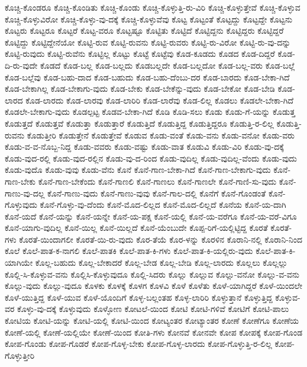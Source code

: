 {ಕೊಚ್ಚಿ-ಕೊಂಡರೂ
ಕೊಚ್ಚಿ-ಕೊಂಡಿತು
ಕೊಚ್ಚಿ-ಕೊಂಡು
ಕೊಚ್ಚಿ-ಕೊಳ್ಳುತ್ತಿ-ರು-ವಿರಿ
ಕೊಚ್ಚಿ-ಕೊಳ್ಳುತ್ತೇವೆ
ಕೊಚ್ಚಿ-ಕೊಳ್ಳುವ
ಕೊಚ್ಚಿ-ಕೊಳ್ಳುವಿರೋ
ಕೊಚ್ಚಿ-ಕೊಳ್ಳು-ವು-ದಕ್ಕೆ
ಕೊಚ್ಚಿ-ಕೊಳ್ಳುವೆವು
ಕೊಟ್ಟ
ಕೊಟ್ಟಂತೆ
ಕೊಟ್ಟದ್ದು
ಕೊಟ್ಟದ್ದೇ
ಕೊಟ್ಟನು
ಕೊಟ್ಟರು
ಕೊಟ್ಟರೂ
ಕೊಟ್ಟರೆ
ಕೊಟ್ಟ-ವರೂ
ಕೊಟ್ಟಷ್ಟೂ
ಕೊಟ್ಟಿತು
ಕೊಟ್ಟಿದೆ
ಕೊಟ್ಟಿದ್ದನು
ಕೊಟ್ಟಿದ್ದರು
ಕೊಟ್ಟಿದ್ದರೆ
ಕೊಟ್ಟಿದ್ದು
ಕೊಟ್ಟಿದ್ದೇನೆಯೋ
ಕೊಟ್ಟಿ-ರುವ
ಕೊಟ್ಟಿ-ರುವನು
ಕೊಟ್ಟಿ-ರುವರು
ಕೊಟ್ಟಿ-ರು-ವಿರೋ
ಕೊಟ್ಟಿ-ರು-ವು-ದನ್ನು
ಕೊಟ್ಟಿ-ರುವುದು
ಕೊಟ್ಟಿ-ರುವೆನು
ಕೊಟ್ಟಿಲ್ಲ
ಕೊಟ್ಟು
ಕೊಟ್ಟೆ
ಕೊಟ್ಟೆವು
ಕೊಡ-ಕೂಡದು
ಕೊಡದ
ಕೊಡ-ದಿದ್ದರೆ
ಕೊಡ-ದಿ-ರು-ವುದೇ
ಕೊಡದೆ
ಕೊಡ-ಬಲ್ಲ
ಕೊಡ-ಬಲ್ಲದು
ಕೊಡಬಲ್ಲದೇ
ಕೊಡ-ಬಲ್ಲದೋ
ಕೊಡ-ಬಲ್ಲ-ವರು
ಕೊಡ-ಬಲ್ಲೆ
ಕೊಡ-ಬಲ್ಲೆವು
ಕೊಡ-ಬಹು-ದಾದ
ಕೊಡ-ಬಹುದು
ಕೊಡ-ಬಹು-ದೆಂಬು-ದರ
ಕೊಡ-ಬಾರದು
ಕೊಡ-ಬೇಕಾ-ಗಿದೆ
ಕೊಡ-ಬೇಕಾಗಿಲ್ಲ
ಕೊಡ-ಬೇಕಾಗು-ವುದು
ಕೊಡ-ಬೇಕು
ಕೊಡ-ಬೇಕೆನ್ನು-ವುದು
ಕೊಡ-ಬೇಕೋ
ಕೊಡ-ಬೇಡಿ
ಕೊಡ-ಲಾರದ
ಕೊಡ-ಲಾರದು
ಕೊಡ-ಲಾರವು
ಕೊಡ-ಲಾರಿರಿ
ಕೊಡ-ಲಾರೆವು
ಕೊಡ-ಲಿಲ್ಲ
ಕೊಡಲು
ಕೊಡಲೇ-ಬೇಕಾ-ಗಿದೆ
ಕೊಡಲೇ-ಬೇಕಾಗು-ವುದು
ಕೊಡಲ್ಪಟ್ಟ
ಕೊಡವ-ಬೇಕಾ-ಗಿದೆ
ಕೊಡಿ
ಕೊಡಿ-ಸಲು
ಕೊಡು
ಕೊಡು-ಗೆ-ಯನ್ನು
ಕೊಡುತ್ತ
ಕೊಡುತ್ತದೆ
ಕೊಡುತ್ತವೆ
ಕೊಡುತ್ತಾ
ಕೊಡುತ್ತಾರೆ
ಕೊಡುತ್ತಿದೆ
ಕೊಡುತ್ತಿದ್ದ
ಕೊಡುತ್ತಿದ್ದರೂ
ಕೊಡುತ್ತಿ-ರ-ಲಿಲ್ಲ
ಕೊಡುತ್ತಿ-ರುವನು
ಕೊಡುತ್ತೀರಿ
ಕೊಡುತ್ತೇನೆ
ಕೊಡುತ್ತೇವೆ
ಕೊಡುವ
ಕೊಡು-ವಂತೆ
ಕೊಡು-ವನು
ಕೊಡು-ವನೋ
ಕೊಡು-ವರು
ಕೊಡು-ವ-ವ-ನೊಬ್ಬ-ನಿದ್ದ
ಕೊಡು-ವವರು
ಕೊಡು-ವಷ್ಟು
ಕೊಡು-ವಾತ
ಕೊಡುವಿ
ಕೊಡು-ವಿರಿ
ಕೊಡು-ವು-ದಕ್ಕೆ
ಕೊಡು-ವುದ-ರಲ್ಲಿ
ಕೊಡು-ವುದ-ರಲ್ಲಿನ
ಕೊಡು-ವು-ದ-ರಿಂದ
ಕೊಡು-ವುದಿಲ್ಲ
ಕೊಡು-ವುದಿಲ್ಲ-ವೆಂದು
ಕೊಡು-ವುದು
ಕೊಡು-ವುದೊ
ಕೊಡು-ವುವು
ಕೊಡು-ವೆನು
ಕೊನೆ
ಕೊನೆ-ಗಾಣ-ಬೇಕಾ-ಗಿದೆ
ಕೊನೆ-ಗಾಣ-ಬೇಕಾಗು-ವುದು
ಕೊನೆ-ಗಾಣ-ಬೇಕು
ಕೊನೆ-ಗಾಣ-ಬೇಕೆಂದು
ಕೊನೆ-ಗಾಣಲಿ
ಕೊನೆ-ಗಾಣಲು
ಕೊನೆ-ಗಾಣಲೇ
ಕೊನೆ-ಗಾಣಿ-ಸು-ವುದು
ಕೊನೆ-ಗಾಣು-ವು-ದಲ್ಲ
ಕೊನೆ-ಗಾಣು-ವುದು
ಕೊನೆ-ಗಾಣು-ವುವು
ಕೊನೆ-ಗಾಲ-ದಲ್ಲಿ
ಕೊನೆಗೆ
ಕೊನೆ-ಗೊಂಡಂತೆ
ಕೊನೆ-ಗೊಳ್ಳುವುದು
ಕೊನೆ-ಗೊಳ್ಳು-ವು-ದೆಂದು
ಕೊನೆ-ಮೊದ-ಲಿಲ್ಲದ
ಕೊನೆ-ಮೊದ-ಲಿಲ್ಲದೆ
ಕೊನೆಯ
ಕೊನೆ-ಯ-ದಾಗಿ
ಕೊನೆ-ಯದೆ
ಕೊನೆ-ಯನ್ನು
ಕೊನೆ-ಯನ್ನೇ
ಕೊನೆ-ಯ-ಪಕ್ಷ
ಕೊನೆ-ಯಲ್ಲಿ
ಕೊನೆ-ಯ-ವರೆಗೂ
ಕೊನೆ-ಯ-ವರೆ-ವಿಗೂ
ಕೊನೆ-ಯಾಗು-ವುದಿಲ್ಲ
ಕೊನೆ-ಯಿಲ್ಲ
ಕೊನೆ-ಯಿಲ್ಲದೆ
ಕೊನೆ-ಯೆಂಬುದೇ
ಕೊಪ್ಪ-ರಿಗೆ-ಯಲ್ಲಿಟ್ಟಿದ್ದ
ಕೊರತೆ
ಕೊರತೆ-ಗಳು
ಕೊರತೆ-ಯಿಂದಾಗಲೀ
ಕೊರತೆ-ಯಿ-ರು-ವುದು
ಕೊರ-ತೆಯೆ
ಕೊರ-ಳನ್ನು
ಕೊರಳಿನ
ಕೊರಾನಿ-ನಲ್ಲಿ
ಕೊರಾನಿ-ನಿಂದ
ಕೊಲೆ
ಕೊಲೆ-ಪಾತ-ಕ-ನಾಗಲಿ
ಕೊಲೆ-ಪಾತಕಿ
ಕೊಲೆ-ಪಾತ-ಕಿ-ಗಳು
ಕೊಲೆ-ಪಾತ-ಕಿ-ಯಲ್ಲಿರು-ವುದು
ಕೊಲೆ-ಪಾತ-ಕಿ-ಯಾಗಿಯೇ
ಕೊಲ್ಲ-ಬಹುದು
ಕೊಲ್ಲ-ಬೇಕಾದರೆ
ಕೊಲ್ಲ-ಬೇಡ
ಕೊಲ್ಲ-ಬೇಡಿ
ಕೊಲ್ಲ-ಲಾರದು
ಕೊಲ್ಲಲು
ಕೊಲ್ಲಲ್ಲು
ಕೊಲ್ಲಿ-ಸಿ-ಕೊಳ್ಳುವ-ವನು
ಕೊಲ್ಲಿಸಿ-ಕೊಳ್ಳುವುದೂ
ಕೊಲ್ಲಿ-ಸಿದರು
ಕೊಲ್ಲು
ಕೊಲ್ಲುವ
ಕೊಲ್ಲು-ವನೋ
ಕೊಲ್ಲು-ವ-ವನು
ಕೊಲ್ಲು-ವುದು
ಕೊಲ್ಲು-ವುದೂ
ಕೊಳಕು
ಕೊಳಕ್ಕೆ
ಕೊಳಗ
ಕೊಳವಿ
ಕೊಳೆ
ಕೊಳೆತು
ಕೊಳೆ-ಯಾಗಿದ್ದರೆ
ಕೊಳೆ-ಯಿಂದಲೇ
ಕೊಳೆ-ಯುತ್ತಿದ್ದ
ಕೊಳೆ-ಯುವ
ಕೊಳೆ-ಯೊಂದಿಗೆ
ಕೊಳ್ಳ-ಬಲ್ಲಂತಹ
ಕೊಳ್ಳ-ಲಾರಿರಿ
ಕೊಳ್ಳುತ್ತಾನೆ
ಕೊಳ್ಳುತ್ತಿದ್ದ
ಕೊಳ್ಳುವ-ವರ
ಕೊಳ್ಳು-ವು-ದಕ್ಕೆ
ಕೊಳ್ಳುವುದು
ಕೊಳ್ಳೋಣ
ಕೋಟಲೆ-ಯಿಂದ
ಕೋಟಿ
ಕೋಟಿ-ಗಳಿವೆ
ಕೋಟಿಗೆ
ಕೋಟಿ-ಪಾಲು
ಕೋಟಿಯ
ಕೋಟಿ-ಯನ್ನು
ಕೋಟಿ-ಯಲ್ಲಿ
ಕೋಟಿ-ಯಿಂದ
ಕೋಟ್ಯಂತರ
ಕೋಟ್ಯಾಂತರ
ಕೋಣೆ
ಕೋಣೆಗೂ
ಕೋಣೆಯ
ಕೋಣೆ-ಯಲ್ಲಿ
ಕೋಣೆ-ಯಲ್ಲಿಯೇ
ಕೋಣೆ-ಯಿಂದ
ಕೋತಿ-ಗಳು
ಕೋನವೆ
ಕೋನವೇ
ಕೋಪ
ಕೋಪಕ್ಕೆ
ಕೋಪ-ಗೊಂಡ
ಕೋಪ-ಗೊಂಡು
ಕೋಪ-ಗೊಡರೆ
ಕೋಪ-ಗೊಳ್ಳ-ಬೇಕು
ಕೋಪ-ಗೊಳ್ಳ-ಲಾರದು
ಕೋಪ-ಗೊಳ್ಳುತ್ತಿ-ರ-ಲಿಲ್ಲ
ಕೋಪ-ಗೊಳ್ಳುತ್ತೀರಿ
}
